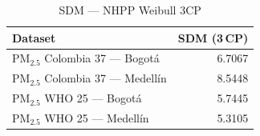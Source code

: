 \begin{table}[htbp]
\centering
\caption{SDM --- NHPP Weibull 3CP}
\label{tab:nhpp_sdm_3cp}
\begin{tabular}{lr}
\toprule
Dataset & SDM (3\,CP) \\
\midrule
PM$_{2.5}$ Colombia 37 --- Bogot\'{a} & 6.7067 \\
PM$_{2.5}$ Colombia 37 --- Medell\'{i}n & 8.5448 \\
PM$_{2.5}$ WHO 25 --- Bogot\'{a} & 5.7445 \\
PM$_{2.5}$ WHO 25 --- Medell\'{i}n & 5.3105 \\
\bottomrule
\end{tabular}
\end{table}

